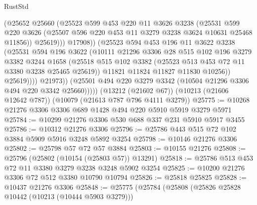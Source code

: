 \begin{lexlean}{RustStd}
\begin{coremodule}
                          (@25652
                            @25660
                            (@25523
                              @599
                              @453
                              @220
                              @11
                              @3626
                              @3238
                              (@25531
                                @599
                                @220
                                @3626
                                (@25507 @596 @220 @453 @11 @3279 @3238 @3624 @10631 @25468 @11856))
                              @25619)))
                        @17908))
                    (@25523
                      @594
                      @453
                      @196
                      @11
                      @3622
                      @3238
                      (@25531
                        @594
                        @196
                        @3622
                        (@10111
                          @21296
                          @3306
                          @28
                          @515
                          @102
                          @196
                          @3279
                          @3382
                          @3244
                          @1658
                          (@25518
                            @515
                            @102
                            @3382
                            (@25523 @513 @453 @72 @11 @3380 @3238 @25465 @25619))
                          @11821
                          @11824
                          @11827
                          @11830
                          @10256))
                      @25619))))
              @21973))
          (@25501 @494 @220 @3279 @3342 (@10504 @21296 @3306 @494 @220 @3342 @25660)))))
    (@13212 (@21602 @67))
    (@10213 (@21606 @12642 @787))
    (@10079 (@21613 @787 @796 @4111 @3279))
@25775 := @10268 @21276 @3306 @3306 @689 @1428 @494 @220 @5910 @5919 @3279 @5971
@25784 := @10299 @21276 @3306 @530 @688 @337 @231 @5910 @5917 @3455
@25786 := @10312 @21276 @3306
@25796 := @25786 @443 @515 @72 @102 @3884 @5909 @5916 @3248 @5892 @3254
@25798 := @10146 @21276 @3306
@25802 := @25798 @57 @72 @57 @3884
@25803 := @10155 @21276
@25808 := @25796 (@25802 (@10154 (@25803 @57)) @13291)
@25818 := @25786 @513 @453 @72 @11 @3380 @3279 @3238 @3248 @5902 @3254
@25825 := @10200 @21276 @3306 @72 @512 @3380 @10790 @10794
@25826 := @25818 @25825
@25828 := @10437 @21276 @3306
@25848 := @25775
    (@25784
      (@25808
        (@25826 @25828 @10442 (@10213 (@10444 @5903 @3279)))

\end{coremodule}
\end{lexlean}

